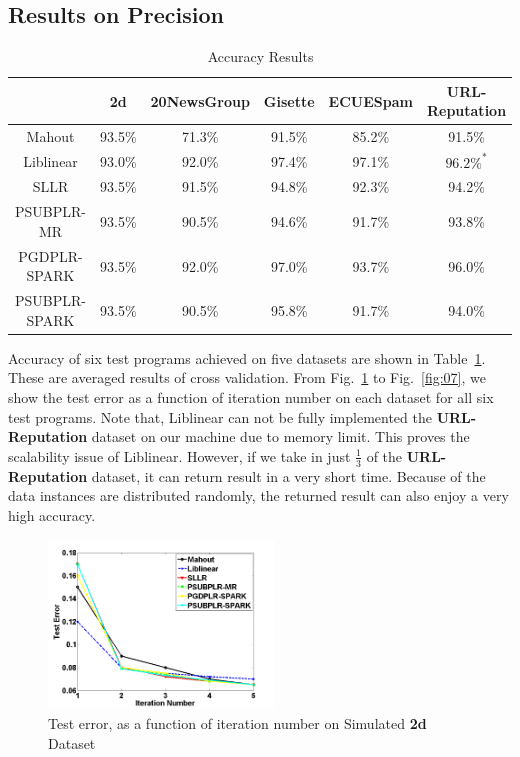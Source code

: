 \documentclass{llncs}
\begin{document}
\subsection{Results on Precision} \label{sec:precision}
\begin{table}[h]
\centering
\caption{Accuracy Results}\label{tab:table3}
\begin{tabular}{|c|c|c|c|c|c|}
\hline
           & 2d   & 20NewsGroup & Gisette & ECUESpam & URL-Reputation \\
\hline
Mahout     & 93.5\% & 71.3\% & 91.5\% & 85.2\% & 91.5\% \\
\hline
Liblinear  & 93.0\% & 92.0\% & 97.4\% & 97.1\% & $96.2\%^*$ \\
\hline
SLLR       & 93.5\% & 91.5\% & 94.8\% & 92.3\% & 94.2\% \\
\hline
PSUBPLR-MR & 93.5\% & 90.5\% & 94.6\% & 91.7\% & 93.8\% \\
\hline
PGDPLR-SPARK & 93.5\% & 92.0\% & 97.0\% & 93.7\% & 96.0\% \\
\hline
PSUBPLR-SPARK & 93.5\% & 90.5\% & 95.8\% & 91.7\% & 94.0\% \\
\hline
\end{tabular}
\end{table}
Accuracy of six test programs achieved on five datasets are shown in Table~\ref{tab:table3}. These are averaged results of cross validation.
From Fig.~\ref{fig:03} to Fig.~\ref{fig:07}, we show the test error as a function of iteration number on each dataset for all six test programs.
Note that, Liblinear can not be fully implemented the \textbf{URL-Reputation} dataset on our machine due to memory limit.
This proves the scalability issue of Liblinear.
However, if we take in just $\frac{1}{3}$ of the \textbf{URL-Reputation} dataset, it can return result in a very short time.
Because of the data instances are distributed randomly, the returned result can also enjoy a very high accuracy.

\begin{figure}[tb] \label{fig:03}
\center \includegraphics[height=4.5cm,width=6cm]{img/2d_accuracy_iteration.png}
\caption{Test error, as a function of iteration number on Simulated \textbf{2d} Dataset}
\end{figure}
\end{document}
